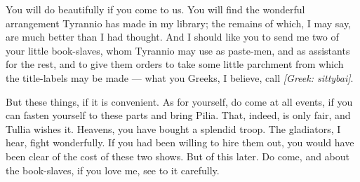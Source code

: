 

 You will do beautifully if you come to us. You will find the wonderful arrangement Tyrannio has made in my library; the remains of which, I may say, are much better than I had thought. And I should like you to send me two of your little book-slaves, whom Tyrannio may use as paste-men, and as assistants for the rest, and to give them orders to take some little parchment from which the title-labels may be made --- what you Greeks, I believe, call \textit{[Greek: sittybai]}.

 But these things, if it is convenient. As for yourself, do come at all events, if you can fasten yourself to these parts and bring Pilia. That, indeed, is only fair, and Tullia wishes it. Heavens, you have bought a splendid troop. The gladiators, I hear, fight wonderfully. If you had been willing to hire them out, you would have been clear of the cost of these two shows. But of this later. Do come, and about the book-slaves, if you love me, see to it carefully.

